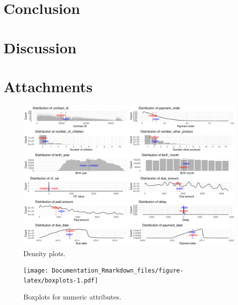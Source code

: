 \documentclass[
]{article}
\begin{document}
\hypertarget{conclusion}{%
\section{Conclusion}\label{conclusion}}

\hypertarget{discussion}{%
\section{Discussion}\label{discussion}}

\hypertarget{attachments}{%
\section{Attachments}\label{attachments}}

\begin{figure}
\centering
\includegraphics{Documentation_Rmarkdown_files/figure-latex/density-1.pdf}
\caption{\label{fig:density}\label{fig:density}Density plots.}
\end{figure}

\begin{figure}
\centering
\texttt{[image: Documentation\_Rmarkdown\_files/figure-latex/boxplots-1.pdf]}
\caption{\label{fig:boxplots}\label{fig:boxplots}Boxplots for numeric attributes.}
\end{figure}
\end{document}
